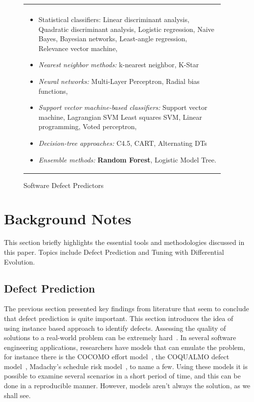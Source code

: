 \documentclass[12pt]{IEEEtran}
\begin{document}
\begin{figure}[tbp!]
	
	{\footnotesize 
		\begin{tabular}{|p{0.95\linewidth}|}\hline\\[-0.3cm]
			\rowcolor[HTML]{FFFFFF}
			\begin{itemize}
				\item Statistical classifiers:
				Linear    discriminant analysis,
				Quadratic discriminant analysis,
				Logistic regression,
				Naive Bayes,
				Bayesian networks,
				Least-angle regression,
				Relevance vector machine,
				
				\item \textit{Nearest neighbor methods:} k-nearest neighbor, K-Star
				
				\item {\em Neural networks:} Multi-Layer Perceptron, Radial bias functions,
				
				\item \textit{Support vector machine-based classifiers:}
				Support vector machine,
				Lagrangian SVM
				Least squares SVM,
				Linear programming,
				Voted perceptron,
				
				\item \textit{Decision-tree approaches:}
				C4.5,
				CART,
				Alternating DTs
				\item \textit{Ensemble methods:}
				\textbf{Random Forest},
				Logistic Model Tree.
			\end{itemize}\\\hline
		\end{tabular}}
		\caption{Software Defect Predictors}\label{fig:lessmann}
	\end{figure}


\section{Background Notes}
\label{back}

This section briefly highlights the essential tools and methodologies discussed in this paper. Topics include Defect Prediction and Tuning with Differential Evolution.
\subsection{Defect Prediction}
The previous section presented key findings from literature that seem to conclude that defect prediction is quite important. This section introduces the idea of using instance based approach to identify defects. Assessing the quality of solutions to a real-world problem can be extremely hard~\cite{menzies2005xomo}. In several software engineering applications, researchers have models that can emulate the problem, for instance there is the COCOMO effort model~\cite[p29-57]{boehm2009software}, the COQUALMO defect model~\cite[p254-268]{boehm2009software}, Madachy’s schedule risk model~\cite[p284-291]{boehm2009software}, to name a few. Using these models it is possible to examine several scenarios in a short period of time, and this can be done in a reproducible manner. However, models aren't always the solution, as we shall see. 
\end{document}

